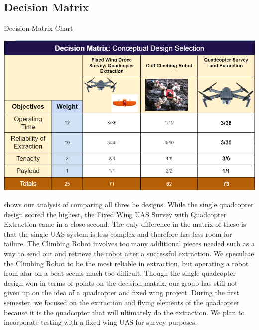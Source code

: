 \documentclass{wrcecapstone}
\begin{document}
\subsection{Decision Matrix}
\begin{table}
\caption{Decision Matrix Chart}
\label{tab:4.6.1}
\begin{center}
\includegraphics[width=\columnwidth]{figures/table-461.png}
\end{center}
\end{table}

 shows our analysis of comparing all three he designs. While the single quadcopter design scored the highest, the Fixed Wing UAS Survey with Quadcopter Extraction came in a close second. The only difference in the matrix of these is that the single UAS system is less complex and therefore has less room for failure. The Climbing Robot involves too many additional pieces needed such as a way to send out and retrieve the robot after a successful extraction. We speculate the Climbing Robot to be the most reliable in extraction, but operating a robot from afar on a boat seems much too difficult. Though the single quadcopter design won in terms of points on the decision matrix, our group has still not given up on the idea of a quadcopter and fixed wing project. During the first semester, we focused on the extraction and flying elements of the quadcopter because it is the quadcopter that will ultimately do the extraction. We plan to incorporate testing with a fixed wing UAS for survey purposes.
\end{document}
